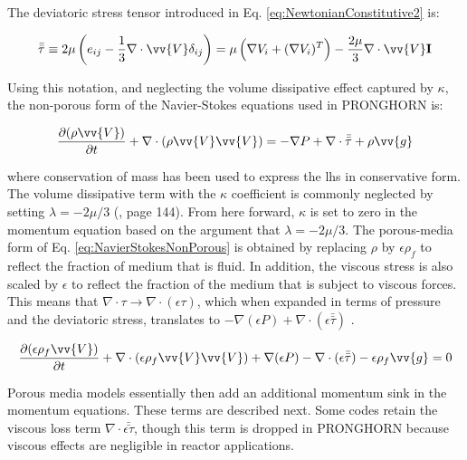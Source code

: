 \documentclass[10pt]{article}
\numberwithin{equation}{section} %
\begin{document}
The deviatoric stress tensor introduced in Eq. \eqref{eq:NewtonianConstitutive2} is:

\begin{equation}
\label{eq:DeviatoricStressTensor}
\bar{\bar{\tau}}\equiv2\mu\left(e_{ij}-\frac{1}{3}\nabla\cdot\vv{V}\delta_{ij}\right)=\mu\left(\nabla V_i+(\nabla V_i)^T\right)-\frac{2\mu}{3}\nabla\cdot\vv{V}\textbf{I}
\end{equation}

Using this notation, and neglecting the volume dissipative effect captured by \(\kappa\), the non-porous form of the Navier-Stokes equations used in PRONGHORN is:

\begin{equation}
\label{eq:NavierStokesNonPorous}
\frac{\partial(\rho\vv{V})}{\partial t}+\nabla\cdot(\rho\vv{V}\vv{V})=-\nabla P+\nabla\cdot\bar{\bar\tau}+\rho\vv{g}
\end{equation}

where conservation of mass has been used to express the \gls{lhs} in conservative form. The volume dissipative term with the \(\kappa\) coefficient is commonly neglected by setting \(\lambda=-2\mu/3\) (\cite{batchelor}, page 144). From here forward, \(\kappa\) is set to zero in the momentum equation based on the argument that \(\lambda=-2\mu/3\). The porous-media form of Eq. \eqref{eq:NavierStokesNonPorous} is obtained by replacing \(\rho\) by \(\epsilon\rho_f\) to reflect the fraction of medium that is fluid. In addition, the viscous stress is also scaled by \(\epsilon\) to reflect the fraction of the medium that is subject to viscous forces. This means that \(\nabla\cdot\tau\rightarrow\nabla\cdot(\epsilon\tau)\), which when expanded in terms of pressure and the deviatoric stress, translates to \(-\nabla(\epsilon P)+\nabla\cdot(\epsilon\bar{\bar{\tau}})\) \cite{thermalpedia}. 

\begin{equation}
\label{eq:NavierStokesPorous}
\frac{\partial(\epsilon\rho_f\vv{V})}{\partial t}+\nabla\cdot(\epsilon\rho_f\vv{V}\vv{V})+\nabla (\epsilon P)-\nabla\cdot(\epsilon\bar{\bar\tau})-\epsilon\rho_f\vv{g}=0
\end{equation}

Porous media models essentially then add an additional momentum sink in the momentum equations. These terms are described next. Some codes retain the viscous loss term \(\nabla\cdot\bar{\bar{\epsilon\tau}}\), though this term is dropped in PRONGHORN because viscous effects are negligible in reactor applications.
\end{document}
